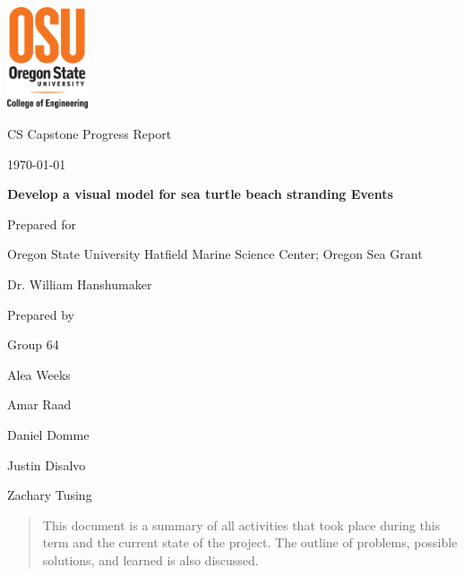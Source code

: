 \documentclass[onecolumn, draftclsnofoot,10pt, compsoc]{IEEEtran}
\def \CapstoneTeamName{		Beached Marine Critters Project Team}
\def \CapstoneTeamNumber{		64}
\def \GroupMemberOne{			Alea Weeks}
\def \GroupMemberTwo{			Amar Raad}
\def \GroupMemberThree{			Daniel Domme}
\def \GroupMemberFour{			Justin Disalvo}
\def \GroupMemberFive{			Zachary Tusing}
\def \CapstoneProjectName{		Develop a visual model for sea turtle beach stranding Events}
\def \CapstoneSponsorCompany{	Oregon State University Hatfield Marine Science Center; Oregon Sea Grant}
\def \CapstoneSponsorPerson{		Dr. William Hanshumaker}
\def \DocType{		%
				Progress Report
				}
\newcommand{\NameSigPair}[1]{\par
\makebox[2.75in][r]{#1} \hfil 	\makebox[3.25in]{\makebox[2.25in]{\hrulefill} \hfill		\makebox[.75in]{\hrulefill}}
\par\vspace{-12pt} \textit{\tiny\noindent
\makebox[2.75in]{} \hfil		\makebox[3.25in]{\makebox[2.25in][r]{Signature} \hfill	\makebox[.75in][r]{Date}}}}
\renewcommand{\NameSigPair}[1]{#1}
\begin{document}
\begin{titlepage}
    \begin{singlespace}
     \includegraphics[height=3cm]{coe_v_spot1}
        \hfill 
        \par\vspace{.2in}
        \centering
        \scshape{
            \huge CS Capstone \DocType \par
            {\normalsize\today}\par
            \vspace{.5in}
            \textbf{\Huge\CapstoneProjectName}\par
            \vspace{1in}
            {\Large Prepared for}\par
            \huge \CapstoneSponsorCompany\par
            \vspace{5pt}
            {\Large\NameSigPair{\CapstoneSponsorPerson}\par}
            \vspace{.5in}
            {\large Prepared by }\par
            Group\CapstoneTeamNumber\par
            \vspace{5pt}
            {\Large
                \NameSigPair{\GroupMemberOne}\par
                \NameSigPair{\GroupMemberTwo}\par
                \NameSigPair{\GroupMemberThree}\par
				\NameSigPair{\GroupMemberFour}\par
			\NameSigPair{\GroupMemberFive}\par
            }
            \vspace{20pt}
        }
        \vfill
        \begin{abstract}
		    \noindent This document is a summary of all activities that took place during this term and the current state of the project. The outline of problems, possible solutions, and learned is also discussed.
		    

\end{abstract}
\end{singlespace}
\end{titlepage}
\end{document}
